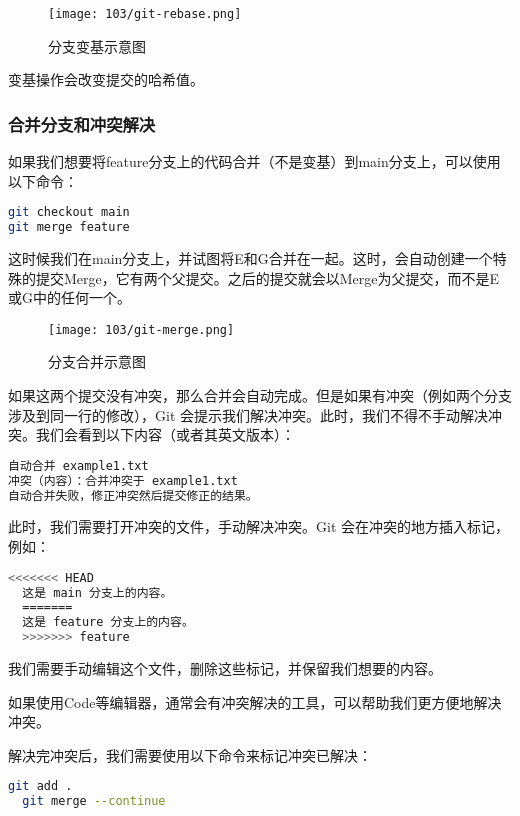 \begin{figure}[ht]
  \centering
  \texttt{[image: 103/git-rebase.png]}
  \caption{分支变基示意图}
  \label{fig:git-rebase}
\end{figure}

变基操作会改变提交的哈希值。

\subsubsection{合并分支和冲突解决}

如果我们想要将feature分支上的代码合并（不是变基）到main分支上，可以使用以下命令：

\begin{lstlisting}[language=bash]
git checkout main
git merge feature
\end{lstlisting}

这时候我们在main分支上，并试图将E和G合并在一起。这时，会自动创建一个特殊的提交Merge，它有两个父提交。之后的提交就会以Merge为父提交，而不是E或G中的任何一个。

\begin{figure}[ht]
  \centering
  \texttt{[image: 103/git-merge.png]}
  \caption{分支合并示意图}
  \label{fig:git-merge}
\end{figure}

如果这两个提交没有冲突，那么合并会自动完成。但是如果有冲突（例如两个分支涉及到同一行的修改），Git 会提示我们解决冲突。此时，我们不得不手动解决冲突。我们会看到以下内容（或者其英文版本）：
\begin{lstlisting}[language=bash]
  自动合并 example1.txt
冲突（内容）：合并冲突于 example1.txt
自动合并失败，修正冲突然后提交修正的结果。
\end{lstlisting}
此时，我们需要打开冲突的文件，手动解决冲突。Git 会在冲突的地方插入标记，例如：
\begin{lstlisting}[language=bash]
  <<<<<<< HEAD
  这是 main 分支上的内容。
  =======
  这是 feature 分支上的内容。
  >>>>>>> feature
\end{lstlisting}
我们需要手动编辑这个文件，删除这些标记，并保留我们想要的内容。

如果使用Code等编辑器，通常会有冲突解决的工具，可以帮助我们更方便地解决冲突。

解决完冲突后，我们需要使用以下命令来标记冲突已解决：
\begin{lstlisting}[language=bash]
  git add .
  git merge --continue
\end{lstlisting}


